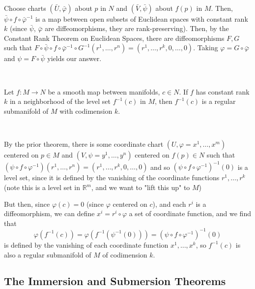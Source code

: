 \documentclass{article}
\begin{document}
\begin{customproof}
  \

  Choose charts $(\bar{U}, \bar{\varphi})$ about $p$ in $N$ and $(\bar{V}, \bar{\psi})$ about $f(p)$ in $M$. Then, $\bar{\psi} \circ f \circ \bar{\varphi} ^{-1}$ is a map between open subsets of Euclidean spaces with constant rank $k$ (since $\bar{\psi}$, $\bar{\varphi}$ are diffeomorphisms, they are rank-preserving). Then, by the Constant Rank Theorem on Euclidean Spaces, there are diffeomorphisms $F, G$ such that $F \circ \bar{\psi} \circ f \circ \bar{\varphi} ^{-1} \circ G ^{-1}(r^1, \dots, r^n) = (r^1, \dots, r^k, 0,\dots, 0)$. Taking $\varphi = G \circ \bar{\varphi}$ and $\psi = F \circ \bar{\psi}$ yields our answer.
\end{customproof}

\begin{theorem}
  \

  Let $f: M \to N$ be a smooth map between manifolds, $c \in N$. If $f$ has constant rank $k$ in a neighborhood of the level set $f ^{-1}(c)$ in $M$, then $f ^{-1}(c)$ is a regular submanifold of $M$ with codimension $k$.
\end{theorem}

\begin{customproof}
  \

  By the prior theorem, there is some coordinate chart $(U,\varphi = x^1, \dots, x^m)$ centered on $p \in M$ and $(V, \psi = y^1,\dots, y^n)$ centered on $f(p) \in N$ such that $(\psi \circ f \circ \varphi ^{-1})(r^1, \dots, r^n) = (r^1, \dots, r^k, 0, \dots, 0)$ and so $(\psi \circ f \circ \varphi ^{-1}) ^{-1}(0)$ is a level set, since it is defined by the vanishing of the coordinate functions $r^1, \dots, r^k$ (note this is a level set in $\mathbb{R}^m$, and we want to "lift this up" to $M$)

  But then, since $\varphi(c) = 0$ (since $\varphi$ centered on $c$), and each $r^i$ is a diffeomorphism, we can define $x^i = r^i \circ \varphi$ a set of coordinate function, and we find that $$\varphi( f ^{-1}(c)) = \varphi( f ^{-1}(\psi ^{-1}(0))) = (\psi \circ f \circ \varphi ^{-1}) ^{-1}(0)$$is defined by the vanishing of each coordinate function $x^1, \dots, x^k$, so $f ^{-1}(c)$ is also a regular submanifold of $M$ of codimension $k$.
\end{customproof}

\subsection{The Immersion and Submersion Theorems}
\
\end{document}
